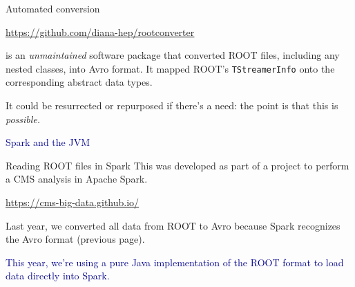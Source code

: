 \documentclass{beamer}
\begin{document}
\begin{frame}{Automated conversion}

\begin{center}
\textcolor{blue}{\underline{\url{https://github.com/diana-hep/rootconverter}}}
\end{center}

is an {\it unmaintained} software package that converted ROOT files, including any nested classes, into Avro format. It mapped ROOT's {\tt\small TStreamerInfo} onto the corresponding abstract data types.

\vfill
It could be resurrected or repurposed if there's a need: the point is that this is {\it possible.}
\end{frame}

\begin{frame}{}
\begin{center}
\LARGE \textcolor{darkblue}{Spark and the JVM}
\end{center}
\end{frame}

\begin{frame}{Reading ROOT files in Spark}
This was developed as part of a project to perform a CMS analysis in Apache Spark.

\begin{center}
\textcolor{blue}{\underline{\url{https://cms-big-data.github.io/}}}
\end{center}

Last year, we converted all data from ROOT to Avro because Spark recognizes the Avro format (previous page).

\vfill
\textcolor{darkblue}{This year, we're using a pure Java implementation of the ROOT format to load data directly into Spark.}
\end{frame}
\end{document}
